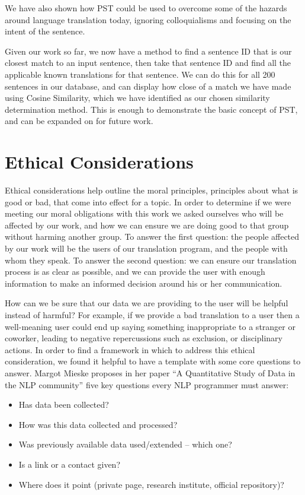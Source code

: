 \documentclass[runningheads]{llncs}
\begin{document}
	We have also shown how PST could be used to overcome some of the hazards around language translation today, ignoring colloquialisms and focusing on the intent of the sentence.

	Given our work so far, we now have a method to find a sentence ID that is our closest match to an input sentence, then take that sentence ID and find all the applicable known translations for that sentence. We can do this for all 200 sentences in our database, and can display how close of a match we have made using Cosine Similarity, which we have identified as our chosen similarity determination method. This is enough to demonstrate the basic concept of PST, and can be expanded on for future work.

	\section{Ethical Considerations}
	Ethical considerations help outline the moral principles, principles about what is good or bad, that come into effect for a topic. In order to determine if we were meeting our moral obligations with this work we asked ourselves who will be affected by our work, and how we can ensure we are doing good to that group without harming another group. To answer the first question: the people affected by our work will be the users of our translation program, and the people with whom they speak. To answer the second question: we can ensure our translation process is as clear as possible, and we can provide the user with enough information to make an informed decision around his or her communication. 

	How can we be sure that our data we are providing to the user will be helpful instead of harmful? For example, if we provide a bad translation to a user then a well-meaning user could end up saying something inappropriate to a stranger or coworker, leading to negative repercussions such as exclusion, or disciplinary actions. In order to find a framework in which to address this ethical consideration, we found it helpful to have a template with some core questions to answer. Margot Mieske proposes in her paper ``A Quantitative Study of Data in the NLP community'' five key questions every NLP programmer must answer: ~\cite{ref_url16}


	\begin{table} 
		\begin{center}
			\begin{itemize}
				\item Has data been collected? 
				\item How was this data collected and processed? 
			 	\item Was previously available data used/extended – which one? 
				\item Is a link or a contact given? 
				\item Where does it point (private page, research institute, official repository)?
			\end{itemize}
		\end{center}
		\label{List: Ethical Questions}
	\end{table}
\end{document}
